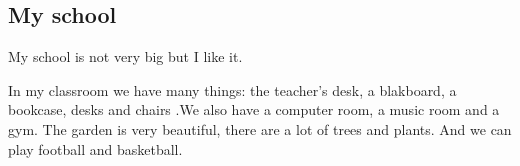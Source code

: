 %
%
\subsection*{My school}

My school is not very big but I like it.

In my classroom we have many things: the teacher’s desk, a blakboard, a bookcase, desks and chairs .We also have a computer room, a music room and a gym.
The garden is very beautiful, there are a lot of trees and plants. And we can play football and basketball. 


